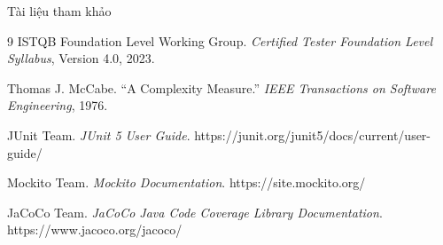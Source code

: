 \documentclass[aspectratio=169,12pt]{beamer}
\begin{document}
\begin{frame}[shrink=1]{Tài liệu tham khảo}
  \small
  \begin{thebibliography}{9}
      ISTQB Foundation Level Working Group.
      \textit{Certified Tester Foundation Level Syllabus}, Version 4.0, 2023.

      Thomas J. McCabe.
      ``A Complexity Measure.'' \textit{IEEE Transactions on Software Engineering}, 1976.

      JUnit Team.
      \textit{JUnit 5 User Guide}. https://junit.org/junit5/docs/current/user-guide/

      Mockito Team.
      \textit{Mockito Documentation}. https://site.mockito.org/

      JaCoCo Team.
      \textit{JaCoCo Java Code Coverage Library Documentation}. https://www.jacoco.org/jacoco/
  \end{thebibliography}
\end{frame}
\end{document}
